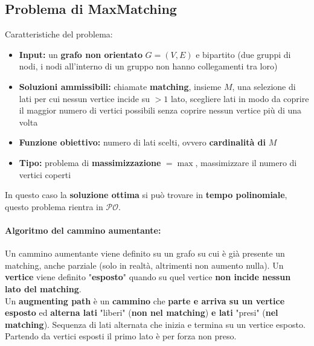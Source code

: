 \newpage


\subsection{Problema di MaxMatching} 
Caratteristiche del problema: 
\begin{itemize}
	\item \textbf{Input:} un \textbf{grafo non orientato} $G = (V, E)$ e bipartito (due gruppi di nodi, i nodi all'interno di un gruppo non hanno collegamenti tra loro)
	
	\item \textbf{Soluzioni ammissibili:} chiamate \textbf{matching}, insieme $M$, una selezione di lati per cui nessun vertice incide su $>1$ lato, scegliere lati in modo da coprire il maggior numero di vertici possibili senza coprire nessun vertice più di una volta
	
	\item \textbf{Funzione obiettivo:} numero di lati scelti, ovvero \textbf{cardinalità di} $M$
	
	\item \textbf{Tipo:} problema di \textbf{massimizzazione} $= \max$, massimizzare il numero di vertici coperti
\end{itemize}

In questo caso la \textbf{soluzione ottima} si può trovare in \textbf{tempo polinomiale}, questo problema rientra in $\mathcal{PO}$. \\

\paragraph{Algoritmo del cammino aumentante:} Un cammino aumentante viene definito su un grafo su cui è già presente un matching, anche parziale (solo in realtà, altrimenti non aumento nulla). Un \textbf{vertice} viene definito "\textbf{esposto}" quando su quel vertice \textbf{non incide nessun lato del matching}. \\

Un \textbf{augmenting path} è un \textbf{cammino} che \textbf{parte e arriva su un vertice esposto} ed \textbf{alterna lati} "liberi" (\textbf{non nel matching}) \textbf{e lati} "presi" (\textbf{nel matching}). Sequenza di lati alternata che inizia e termina su un vertice esposto. Partendo da vertici esposti il primo lato è per forza non preso.\\

